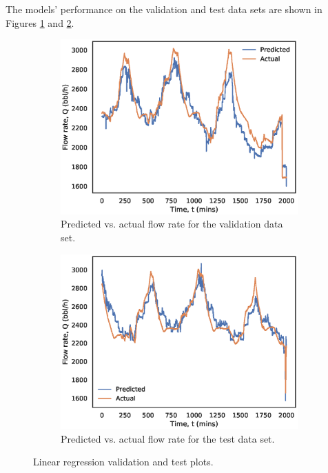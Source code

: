 The models' performance on the validation and test data sets are shown in Figures \ref{fig:08LSValidation} and \ref{fig:08LSTest}.
\begin{figure}[h]
     \centering
     \begin{subfigure}[b]{0.48\textwidth}
         \centering
         \includegraphics[width=\textwidth]{images/suncor/08ls_validation.eps}
         \caption{Predicted vs. actual flow rate for the validation data set.}
         \label{fig:08LSValidation}
     \end{subfigure}
     \hfill
     \begin{subfigure}[b]{0.48\textwidth}
         \centering
         \includegraphics[width=\textwidth]{images/suncor/08ls_test.eps}
         \caption{Predicted vs. actual flow rate for the test data set.}
         \label{fig:08LSTest}
     \end{subfigure}
     \caption{Linear regression validation and test plots.}
        \label{fig:08LSPlots}
\end{figure}

